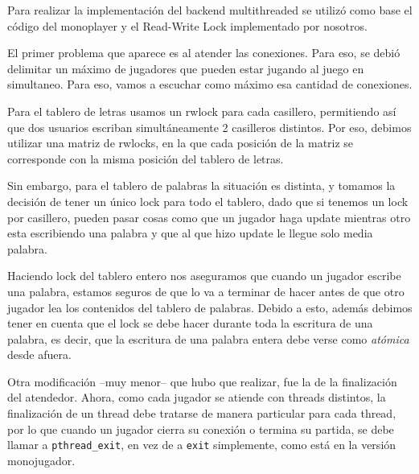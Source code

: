 
Para realizar la implementación del backend multithreaded se utilizó como base el código del monoplayer y el Read-Write Lock implementado por nosotros.

El primer problema que aparece es al atender las conexiones. Para eso, se debió delimitar un máximo de jugadores que pueden estar jugando al juego en simultaneo. Para eso, vamos a escuchar como máximo esa cantidad de conexiones.

Para el tablero de letras usamos un rwlock para cada casillero, permitiendo así que dos usuarios escriban simultáneamente 2 casilleros distintos. Por eso, debimos utilizar una matriz de rwlocks, en la que cada posición de la matriz se corresponde con la misma posición del tablero de letras.

Sin embargo, para el tablero de palabras la situación es distinta, y tomamos la decisión de tener un único lock para todo el tablero, dado que si tenemos un lock por casillero, pueden pasar cosas como que un jugador haga update mientras otro esta escribiendo una palabra y que al que hizo update le llegue solo media palabra.

Haciendo lock del tablero entero nos aseguramos que cuando un jugador escribe una palabra, estamos seguros de que lo va a terminar de hacer antes de que otro jugador lea los contenidos del tablero de palabras. Debido a esto, además debimos tener en cuenta que el lock se debe hacer durante toda la escritura de una palabra, es decir, que la escritura de una palabra entera debe verse como \emph{atómica} desde afuera.

Otra modificación --muy menor-- que hubo que realizar, fue la de la finalización del atendedor. Ahora, como cada jugador se atiende con threads distintos, la finalización de un thread debe tratarse de manera particular para cada thread, por lo que cuando un jugador cierra su conexión o termina su partida, se debe llamar a \texttt{pthread\_exit}, en vez de a \texttt{exit} simplemente, como está en la versión monojugador.


